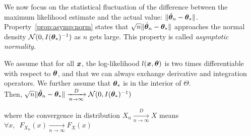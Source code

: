 We now focus on the statistical fluctuation of the difference between the
maximum likelihood estimate and the actual value: $\|\hat{\boldsymbol{\theta}}_n -
\boldsymbol{\theta}_*\|$. Property~\ref{prop:asymp:norm} states that
$\sqrt{n}\|\hat{\boldsymbol{\theta}}_n - \boldsymbol{\theta}_*\|$ approaches the normal density
$\mathcal{N}(0, I(\boldsymbol{\theta}_*)^{-1})$ as $n$ gets large. This property is called \emph{asymptotic normality}.

\begin{prop}
  \label{prop:asymp:norm}
  We assume that for all $\boldsymbol{x}$, the log-likelihood $l(\boldsymbol{x}, \boldsymbol{\theta})$ is two times differentiable with respect to $\boldsymbol{\theta}$, and that we
  can always exchange derivative and integration operators. We further assume
  that $\boldsymbol{\theta}_*$ is in the interior of $\Theta$.\\
  Then,
  $\sqrt{n} \| \hat{\boldsymbol{\theta}}_n - \boldsymbol{\theta}_* \| \xrightarrow[n \rightarrow
  \infty]{D}  \mathcal{N}(0,
  I(\boldsymbol{\theta}_*)^{-1})$
\end{prop}
where the convergence in distribution $ X_n \xrightarrow[n \rightarrow \infty]{D} X$ means  $\forall x, \enspace F_{X_n}(x)
\xrightarrow[n \rightarrow \infty]{} F_X(x)$
